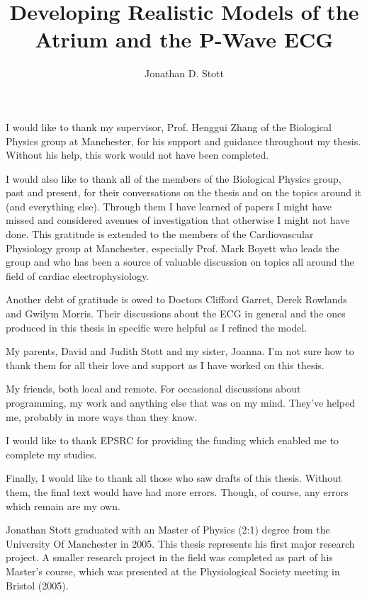 \documentclass[12pt,PhD]{muthesis}
\begin{document}
    \title{Developing Realistic Models of the Atrium and the P-Wave ECG}
    \author{Jonathan D. Stott}

    \beforeabstract
    \singlespace
    
    \onehalfspace
    \afterabstract
I would like to thank my supervisor, Prof. Henggui Zhang of the Biological Physics
group at Manchester, for his support and guidance throughout my thesis.
Without his help, this work would not have been completed.

I would also like to thank all of the members of the Biological Physics group,
past and present, for their conversations on the thesis and on the topics around
it (and everything else).
Through them I have learned of papers I might have missed and considered avenues
of investigation that otherwise I might not have done.
This gratitude is extended to the members of the Cardiovascular Physiology
group at Manchester, especially Prof. Mark Boyett who leads the group and who
has been a source of valuable discussion on topics all around the field of
cardiac electrophysiology.

Another debt of gratitude is owed to Doctors Clifford Garret, Derek Rowlands and
Gwilym Morris.
Their discussions about the ECG in general and the ones produced in this thesis
in specific were helpful as I refined the model.

My parents, David and Judith Stott and my sister, Joanna.
I'm not sure how to thank them for all their love and support as I have worked
on this thesis.

My friends, both local and remote.
For occasional discussions about programming, my work and anything else that was
on my mind.
They've helped me, probably in more ways than they know.

I would like to thank EPSRC for providing the funding which enabled me to
complete my studies.

Finally, I would like to thank all those who saw drafts of this thesis.
Without them, the final text would have had more errors.
Though, of course, any errors  which remain are my own.


Jonathan Stott graduated with an Master of Physics (2:1) degree from the
University Of Manchester in 2005.
This thesis represents his first major research project.
A smaller research project in the field was completed as part of his Master's
course, which was presented at the Physiological Society meeting in Bristol
(2005).


    \afterpreface
    

   
   
   
   
   
   
   

%    
    
\end{document}
